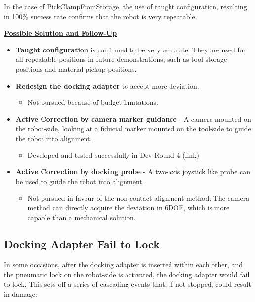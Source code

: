 In the case of PickClampFromStorage, the use of taught configuration, resulting in 100$\%$ success rate confirms that the robot is very repeatable. 

\textbf{\uline{Possible Solution and Follow-Up}}

\begin{itemize}
	\item \textbf{Taught configuration} is confirmed to be very accurate. They are used for all repeatable positions in future demonstrations, such as tool storage positions and material pickup positions.

	\item \textbf{Redesign the docking adapter} to accept more deviation.

\begin{itemize}
	\item Not pursued because of budget limitations.

\end{itemize}
	\item \textbf{Active Correction by camera marker guidance} - A camera mounted on the robot-side, looking at a fiducial marker mounted on the tool-side to guide the robot into alignment.

\begin{itemize}
	\item Developed and tested successfully in Dev Round 4 (link)

\end{itemize}
	\item  \textbf{Active Correction by docking probe} - A two-axis joystick like probe can be used to guide the robot into alignment.

\begin{itemize}
	\item Not pursued in favour of the non-contact alignment method. The camera method can directly acquire the deviation in 6DOF, which is more capable than a mechanical solution.

\end{itemize}
\end{itemize}

\subsection{Docking Adapter Fail to Lock}

In some occasions, after the docking adapter is inserted within each other, and the pneumatic lock on the robot-side is activated, the docking adapter would fail to lock. This sets off a series of cascading events that, if not stopped, could result in damage:

